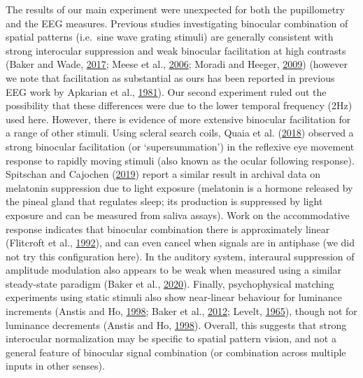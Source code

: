 \documentclass[
]{article}
\begin{document}
The results of our main experiment were unexpected for both the pupillometry and the EEG measures. Previous studies investigating binocular combination of spatial patterns (i.e.~sine wave grating stimuli) are generally consistent with strong interocular suppression and weak binocular facilitation at high contrasts (Baker and Wade, \protect\hyperlink{ref-Baker2017}{2017}; Meese et al., \protect\hyperlink{ref-Meese2006}{2006}; Moradi and Heeger, \protect\hyperlink{ref-Moradi2009}{2009}) (however we note that facilitation as substantial as ours has been reported in previous EEG work by Apkarian et al., \protect\hyperlink{ref-Apkarian1981}{1981}). Our second experiment ruled out the possibility that these differences were due to the lower temporal frequency (2Hz) used here. However, there is evidence of more extensive binocular facilitation for a range of other stimuli. Using scleral search coils, Quaia et al. (\protect\hyperlink{ref-Quaia2018}{2018}) observed a strong binocular facilitation (or `supersummation') in the reflexive eye movement response to rapidly moving stimuli (also known as the ocular following response). Spitschan and Cajochen (\protect\hyperlink{ref-Spitschan2019}{2019}) report a similar result in archival data on melatonin suppression due to light exposure (melatonin is a hormone released by the pineal gland that regulates sleep; its production is suppressed by light exposure and can be measured from saliva assays). Work on the accommodative response indicates that binocular combination there is approximately linear (Flitcroft et al., \protect\hyperlink{ref-Flitcroft1992}{1992}), and can even cancel when signals are in antiphase (we did not try this configuration here). In the auditory system, interaural suppression of amplitude modulation also appears to be weak when measured using a similar steady-state paradigm (Baker et al., \protect\hyperlink{ref-Baker2020}{2020}). Finally, psychophysical matching experiments using static stimuli also show near-linear behaviour for luminance increments (Anstis and Ho, \protect\hyperlink{ref-Anstis1998}{1998}; Baker et al., \protect\hyperlink{ref-Baker2012}{2012}; Levelt, \protect\hyperlink{ref-Levelt1965}{1965}), though not for luminance decrements (Anstis and Ho, \protect\hyperlink{ref-Anstis1998}{1998}). Overall, this suggests that strong interocular normalization may be specific to spatial pattern vision, and not a general feature of binocular signal combination (or combination across multiple inputs in other senses).
\end{document}
